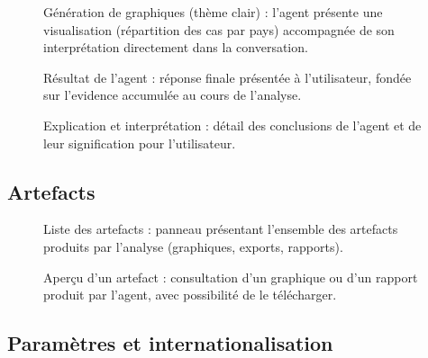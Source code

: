 \begin{figure}[H]
\centering
{}
\caption{Génération de graphiques (thème clair) : l'agent présente une visualisation (répartition des cas par pays) accompagnée de son interprétation directement dans la conversation.}
\label{fig:annexe-generate-graph-white}
\end{figure}

\begin{figure}[H]
\centering
{}
\caption{Résultat de l'agent : réponse finale présentée à l'utilisateur, fondée sur l'evidence accumulée au cours de l'analyse.}
\label{fig:annexe-agent-result}
\end{figure}

\begin{figure}[H]
\centering
{}
\caption{Explication et interprétation : détail des conclusions de l'agent et de leur signification pour l'utilisateur.}
\label{fig:annexe-interpretation}
\end{figure}

\subsection{Artefacts}

\begin{figure}[H]
\centering
{}
\caption{Liste des artefacts : panneau présentant l'ensemble des artefacts produits par l'analyse (graphiques, exports, rapports).}
\label{fig:annexe-artifact-list}
\end{figure}

\begin{figure}[H]
\centering
{}
\caption{Aperçu d'un artefact : consultation d'un graphique ou d'un rapport produit par l'agent, avec possibilité de le télécharger.}
\label{fig:annexe-artifact-preview}
\end{figure}

\subsection{Paramètres et internationalisation}

